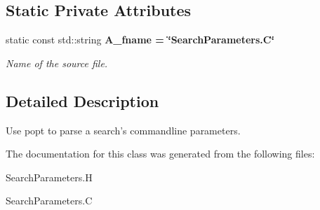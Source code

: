 \subsection*{Static Private Attributes}
\begin{CompactItemize}
\item 
static const std::string \bf{A\_\-fname} = \char`\"{}Search\-Parameters.C\char`\"{}\label{classSimSite3D_1_1SearchParameters_865031ac44a12f4833a96bf17e718b2c}

\begin{CompactList}\small\item\em Name of the source file. \item\end{CompactList}\end{CompactItemize}


\subsection{Detailed Description}
Use popt to parse a search's commandline parameters. 



The documentation for this class was generated from the following files:\begin{CompactItemize}
\item 
Search\-Parameters.H\item 
Search\-Parameters.C\end{CompactItemize}
